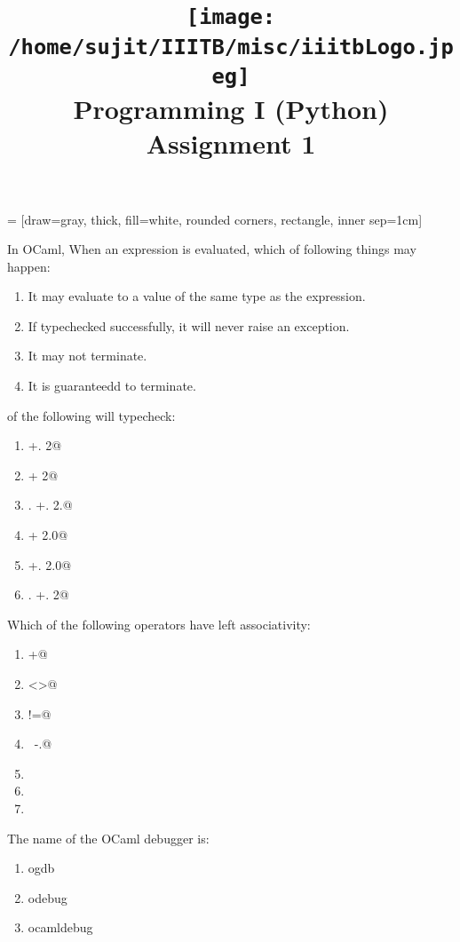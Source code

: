\documentclass[addpoints,11pt]{exam}
\author{}
\title{\texttt{[image: /home/sujit/IIITB/misc/iiitbLogo.jpeg]} \\ Programming I (Python) \\ Assignment 1}
\date{}
\begin{document}
   = [draw=gray, thick, fill=white, rounded corners, rectangle, inner sep=1cm]
\maketitle


\thispagestyle{head}
\begin{questions}
\question In OCaml, When an expression is evaluated, which of following things may happen:
\begin{enumerate}
\item It may evaluate to a value of the same type as the expression.
\item If typechecked successfully, it will never raise an exception.
\item It may not terminate.
\item It is guaranteedd to terminate.
\end{enumerate}
\question of the following will typecheck:
\begin{enumerate}
\item {} +. 2@
\item {} + 2@
\item {}. +. 2.@
\item {} + 2.0@
\item {} +. 2.0@
\item {}. +. 2@
\end{enumerate}\question Which of the following operators have left associativity:
\begin{enumerate}
\item \lstinline@+@
\item \lstinline@<>@
\item \lstinline@!=@
\item \lstinline@~-.@
\item \lstinline@mod@
\item \lstinline@lsr@
\item \lstinline@lnot@
\end{enumerate}
\question The name of the OCaml debugger is:
\begin{enumerate}
\item ogdb
\item odebug
\item ocamldebug

\end{enumerate}
\end{questions}
\end{document}
